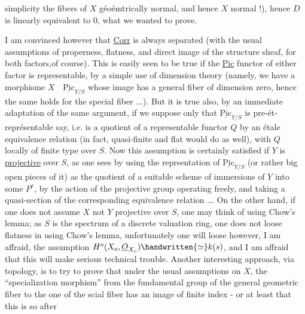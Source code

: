 simplicity the fibers of $X$ géoémtrically normal, and hence $X$ normal !), hence $D$ is linearly equivalent to $0$, what we wanted to prove.

I am convinced however that \uline{Corr} is always separated (with the usual assumptions of properness, flatness, and direct image of the structure sheaf, for both factors,of course). This is easily seen to be true if the \uline{Pic} functor of either factor is representable, by a simple use of dimension theory (namely, we have a morphisme $X\quad\underline{\mathrm{Pic}}_{Y/S}$ whose image has a general fiber of dimension zero, hence the same holds for the special fiber ...). But it is true also, by an immediate adaptation of the same argument, if we suppose only that $\underline{\mathrm{Pic}}_{Y/S}$ is pre-ét-représentable say, i.e. is a quotient of a representable functor $Q$ by an étale equivalence relation (in fact, quasi-finite and flat would do as well), with $Q$ locally of finite type over $S$. Now this assumption is certainly satisfied if $Y$ is \uline{projective} over $S$, as one sees by using the reprsentation of $\underline{\mathrm{Pic}}_{Y/S}$ (or rather big open pieces of it) as the quotient of a suitable scheme of immersions of $Y$ into some $P^{r}$, by the action of the projective group operating freely, and taking a quasi-section of the corresponding equivalence relation ... On the other hand, if one does not assume $X$ not $Y$ projective over $S$, one may think of using Chow's lemma; as $S$ is the spectrum of a discrete valuation ring, one does not loose flatness in using Chow's lemma, unfortunately one will loose however, I am affraid, the assumption $H^{o}(X_{o},\underline{O}_{X_{o}})\handwritten{\simeq}k(s)$, and I am affraid that this will make serious technical trouble. Another interesting approach, via topology, is to try to prove that under the usual assumptions on $X$, the ``specialization morphism'' from the fundamental group of the general geometric fiber to the one of the scial fiber has an image of finite index - or at least that this is so after
